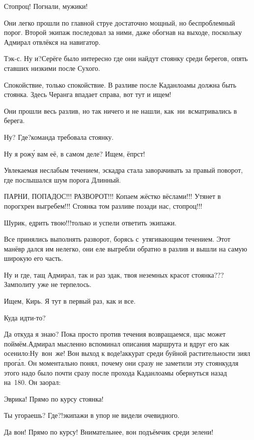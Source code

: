 \diagdash Стопроц! Погнали, мужики!

Они легко прошли по главной струе достаточно мощный, но беспроблемный порог. Второй экипаж последовал за ними, даже обогнав на выходе, поскольку Адмирал отвлёкся на навигатор.

\diagdash Тэк-с. Ну и?\mdash Серёге было интересно где они найдут стоянку среди берегов, опять ставших низкими после Сухого.

\diagdash Спокойствие, только спокойствие. В разливе после Каданлоамы должна быть стоянка. Здесь Черанга впадает справа, вот тут и ищем!

Они прошли весь разлив, но так ничего и не нашли, как~ни~всматривались в берега.

\diagdash Ну? Где?\mdash команда требовала стоянку.

\diagdash Ну я рож\'{у} вам её, в самом деле? Ищем, ёпрст! 

Увлекаемая неслабым течением, эскадра стала заворачивать за правый поворот, где послышался шум порога Длинный.

\diagdash ПАРНИ, ПОПАДОС!!! РАЗВОРОТ!!! Копаем жёстко вёслами!!! Утянет в порог\mdash хрен выгребем!!! Стоянка том разливе позади нас, стопроц!!!

\diagdash Шурик, едрить твою!!!\mdash только и успели ответить экипажи. 

Все принялись выполнять разворот, борясь с~утягивающим течением. Этот манёвр дался им нелегко, они еле выгребли обратно в разлив и вышли на самую широкую его часть.

\diagdash Ну и где, тащ Адмирал, так и раз эдак, твоя неземных красот стоянка???\mdash Замполиту уже не терпелось.

\diagdash Ищем, Кирь. Я тут в первый раз, как и все.

\diagdash Куда идти-то?

\diagdash Да откуда я знаю? Пока просто против течения возвращаемся, щас может поймём.\mdash Адмирал мысленно вспоминал описания маршрута и вдруг его как осенило:\mdash Ну~вон~же! Вон выход к воде!\mdash аккурат среди буйной растительности зиял прог\'{а}л. Он моментально понял, почему они сразу не заметили эту стоянку\mdash для этого надо было почти сразу после прохода Каданлоамы обернуться назад на~180\degree. Он заорал:

\diagdash Эврика! Прямо по курсу стоянка!

\diagdash Ты угораешь? Где?!\mdash экипажи в упор не видели очевидного.

\diagdash Да вон! Прямо по курсу! Внимательнее, вон подъёмчик среди зелени!

